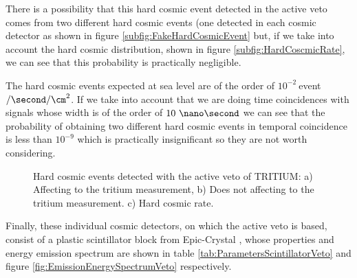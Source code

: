 There is a possibility that this hard cosmic event detected in the active veto comes from two different hard cosmic events (one detected in each cosmic detector as shown in figure \ref{subfig:FakeHardCosmicEvent} but, if we take into account the hard cosmic distribution, shown in figure \ref{subfig:HardCoscmicRate}, we can see that this probability is practically negligible.

The hard cosmic events expected at sea level are of the order of $10^{-2}~$event$/\second/\cm^2$. If we take into account that we are doing time coincidences with signals whose width is of the order of $10~\nano\second$ we can see that the probability of obtaining two different hard cosmic events in temporal coincidence is less than $10^{-9}$ which is practically insignificant so they are not worth considering.

\begin{figure}[]
 \centering
 \caption{Hard cosmic events detected with the active veto of TRITIUM: a) Affecting to the tritium measurement, b) Does not affecting to the tritium measurement. c) Hard cosmic rate.}
 \label{fig:HardCosmicEventsSimulation}
\end{figure}

Finally, these individual cosmic detectors, on which the active veto is based, consist of a plastic scintillator block from Epic-Crystal \cite{ScintillatorVeto}, whose properties and energy emission spectrum are shown in table \ref{tab:ParametersScintillatorVeto} and figure \ref{fig:EmissionEnergySpectrumVeto} respectively.

